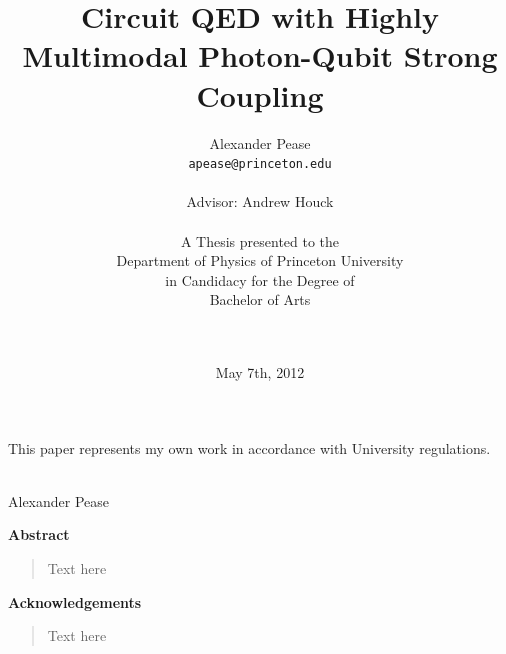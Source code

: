 \documentclass[12 pt]{book}
\newenvironment{abstract}
{\thispagestyle{empty}
\begin{center}
\vspace*{1.5cm}
{\Large \bfseries Abstract}
\end{center}
\vspace{0.5cm}
\begin{quote}}
{\end{quote}}
\newenvironment{acknowledgements}
{\thispagestyle{empty}
\begin{center}
\vspace*{1.5cm}
{\Large \bfseries Acknowledgements}
\end{center}
\vspace{0.5cm}
\begin{quote}}
{\end{quote}}
\begin{document}
\title{Circuit QED with Highly Multimodal Photon-Qubit Strong Coupling}

\author{Alexander Pease \\
\texttt{apease@princeton.edu}\\
\\
Advisor: Andrew Houck\\
\\
A Thesis presented to the\\ 
Department of Physics of
Princeton University\\
in Candidacy for the Degree of \\
Bachelor of Arts\\
\\
\\}

\date{May 7th, 2012}
\maketitle

\begin{center}
This paper represents my own work in accordance with University regulations. \par
\vspace{1.5cm}
\hspace{0.5cm} \makebox[3.5in]{\hrulefill}\\
Alexander Pease
\end{center}

\newpage
\begin{abstract}
Text here
\end{abstract}

\newpage
\begin{acknowledgements}
Text here
\end{acknowledgements}




\setcounter{secnumdepth}{3} %
\setcounter{tocdepth}{3}    %
\tableofcontents            %



\listoffigures	%

\listoftables  %
\end{document}
